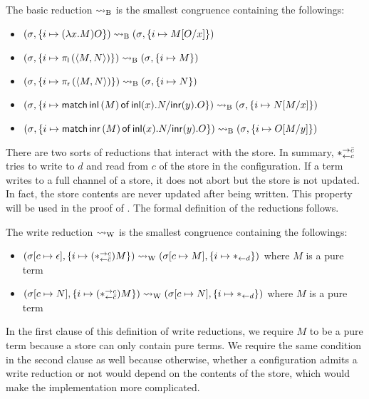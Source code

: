 {\begin{definition}
 The basic reduction $\rightsquigarrow_{\mathrm B}$ is the smallest congruence containing
 the followings:
 \begin{itemize}
  \item  $({\sigma}{},{\{i\mapsto {(\lambda x.M)O}\}})\rightsquigarrow_{\mathrm B}
	 ({\sigma}{},{\{i\mapsto {M[O/x]}\}})$
  \item $({\sigma}{},{\{i\mapsto {\pi_{\mathsf l}\left({\langle{M,N}\rangle}\right)}\}}) \rightsquigarrow_{\mathrm B}
	 ({\sigma}{},{           \{i\mapsto {M}\}   })$
  \item $({\sigma}{},{\{i\mapsto {\pi_{\mathsf r}\left({\langle{M,N}\rangle}\right)}\}}) \rightsquigarrow_{\mathrm B}
	 ({\sigma}{},{             \{i\mapsto {N}\} })$
  \item $({\sigma}{},{\{i\mapsto {\mathsf{match}\,{\mathsf{inl}\left({M}\right)}\,\mathsf{of}\, \mathsf{inl}({x}). {N}/ \mathsf{inr}({y}). {O}}\}}) \rightsquigarrow_{\mathrm B}
	 ({\sigma}{},{              \{i\mapsto {N[M/x]}\}})$
  \item $({\sigma}{},{\{i\mapsto {\mathsf{match}\,{\mathsf{inr}\left({M}\right)}\,\mathsf{of}\, \mathsf{inl}({x}). {N}/ \mathsf{inr}({y}). {O}}\}}) \rightsquigarrow_{\mathrm B}
	 ({\sigma}{},{                  \{i\mapsto {O[M/y]}\}})$
 \end{itemize}
\end{definition}

There are two sorts of reductions that interact with the store.
In summary, $\ast^{\rightarrow {\bar{c}}}_{\leftarrow{c}}$ tries to write to $d$ and read from
$c$ of the store in the configuration.
 If a term writes to a full channel of
a store, it does not abort but the store is not updated.  In fact, the
store contents are never updated after being written.
This property will be used in the proof of .
The formal definition of the reductions follows.
\begin{definition}
 The write reduction $\rightsquigarrow_{\mathrm W}$ is the smallest congruence
 containing the followings:
 \begin{itemize}
  \item $({\sigma}{[c\mapsto \epsilon]},{\{i\mapsto {(\ast^{\rightarrow {c}}_{\leftarrow{\bar{c}}})M}\}}) \rightsquigarrow_{\mathrm W}
	({\sigma}{[c\mapsto M]},{\{i\mapsto {\ast_{\leftarrow{d}}}\}})
	$ where $M$ is a pure term
  \item $({\sigma}{[c\mapsto N]},{\{i\mapsto {(\ast^{\rightarrow {c}}_{\leftarrow{\bar{c}}}) M}\}}) \rightsquigarrow_{\mathrm W}
	({\sigma}{[c\mapsto	N]},{\{i\mapsto {\ast_{\leftarrow{d}}}\}})$ where $M$ is a pure term
 \end{itemize}
\end{definition}
In the first clause of this definition of write reductions, we require
$M$ to be a pure
term because a store can only contain pure terms.
We require the same condition in the second clause as well because
otherwise, whether a configuration admits a write reduction or not
would depend on the contents of the store, which would make the
implementation more complicated.

}
